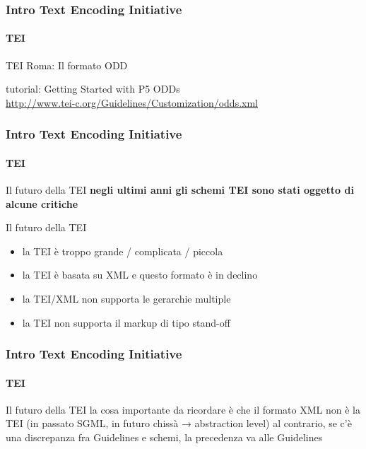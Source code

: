 \begin{frame}
	\frametitle{Intro Text Encoding Initiative}
	\framesubtitle{TEI}
	\addtocounter{nframe}{1}

	\begin{block}{TEI Roma: Il formato ODD}

		tutorial: Getting Started with P5 ODDs\\
		\url{http://www.tei-c.org/Guidelines/Customization/odds.xml}

	\end{block}


\end{frame}






\begin{frame}
	\frametitle{Intro Text Encoding Initiative}
	\framesubtitle{TEI}
	\addtocounter{nframe}{1}

	\begin{block}{Il futuro della TEI}
		\textbf{negli ultimi anni gli schemi TEI sono stati oggetto di alcune critiche}
	\end{block}

	\begin{block}{Il futuro della TEI}
		\begin{itemize}
			\item la TEI è troppo grande / complicata / piccola
			\item la TEI è basata su XML e questo formato è in declino
			\item la TEI/XML non supporta le gerarchie multiple
			\item la TEI non supporta il markup di tipo stand-off
		\end{itemize}
	\end{block}

\end{frame}


\begin{frame}
	\frametitle{Intro Text Encoding Initiative}
	\framesubtitle{TEI}
	\addtocounter{nframe}{1}

	\begin{block}{Il futuro della TEI}
		la cosa importante da ricordare è che il formato XML non è
		la TEI (in passato SGML, in futuro chissà → abstraction level)
		al contrario, se c’è una discrepanza fra Guidelines e schemi,
		la precedenza va alle Guidelines
	\end{block}

\end{frame}


